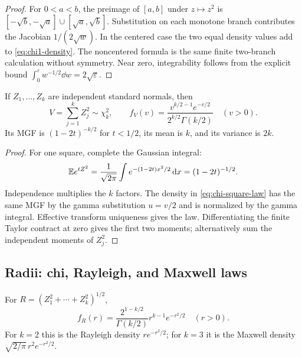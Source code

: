 \begin{proof}
For $0<a<b$, the preimage of $[a,b]$ under $z\mapsto z^2$ is
$[-\sqrt b,-\sqrt a]\cup[\sqrt a,\sqrt b]$.  Substitution on each monotone branch contributes the Jacobian $1/(2\sqrt w)$.  In the centered case the two equal density values add to \eqref{eq:chi1-density}.  The noncentered formula is the same finite two-branch calculation without symmetry.  Near zero, integrability follows from the explicit bound $\int_0^\varepsilon w^{-1/2}\dd w=2\sqrt\varepsilon$.
\end{proof}

\begin{theorem}\label{thm:chi-square}
If $Z_1,\dots,Z_k$ are independent standard normals, then
\begin{equation}\label{eq:chi-square-law}
 V=\sum_{j=1}^kZ_j^2\sim\chi_k^2,
 \qquad
 f_V(v)=\frac{v^{k/2-1}e^{-v/2}}{2^{k/2}\Gamma(k/2)}\quad(v>0).
\end{equation}
Its MGF is $(1-2t)^{-k/2}$ for $t<1/2$, its mean is $k$, and its variance is $2k$.
\end{theorem}

\begin{proof}
For one square, complete the Gaussian integral:
\[
 \mathbb E e^{tZ^2}=\frac1{\sqrt{2\pi}}\int e^{-(1-2t)x^2/2}\,\mathrm d x=(1-2t)^{-1/2}.
\]
Independence multiplies the $k$ factors.  The density in \eqref{eq:chi-square-law} has the same MGF by the gamma substitution $u=v/2$ and is normalized by the gamma integral.  Effective transform uniqueness gives the law.  Differentiating the finite Taylor contract at zero gives the first two moments; alternatively sum the independent moments of $Z_j^2$.
\end{proof}

\subsection{Radii: chi, Rayleigh, and Maxwell laws}

\begin{corollary}\label{cor:chi-radius}
For $R=(Z_1^2+\cdots+Z_k^2)^{1/2}$,
\begin{equation}\label{eq:chi-density}
 f_R(r)=\frac{2^{1-k/2}}{\Gamma(k/2)}r^{k-1}e^{-r^2/2}
 \quad(r>0).
\end{equation}
For $k=2$ this is the Rayleigh density $re^{-r^2/2}$; for $k=3$ it is the Maxwell density $\sqrt{2/\pi}\,r^2e^{-r^2/2}$.
\end{corollary}

